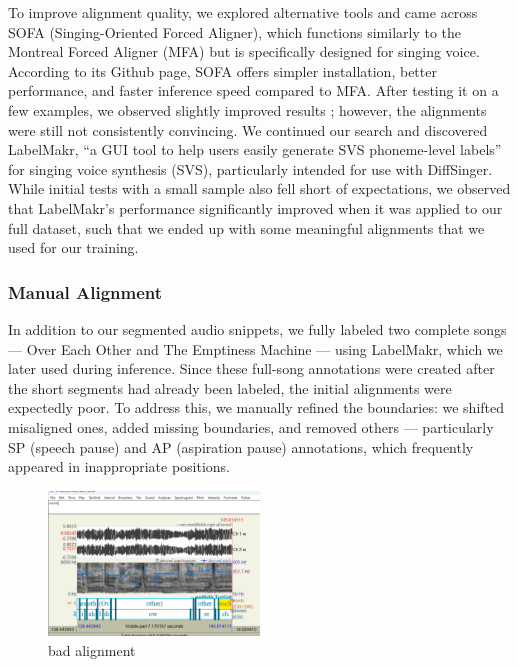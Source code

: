 \documentclass[a4paper]{article}
\begin{document}
To improve alignment quality, we explored alternative tools and came across SOFA (Singing-Oriented Forced Aligner), which functions similarly to the Montreal Forced Aligner (MFA) but is specifically designed for singing voice. According to its Github page, SOFA offers simpler installation, better performance, and faster inference speed compared to MFA. After testing it on a few examples, we observed slightly improved results \cite{Greenleaf2001}; however, the alignments were still not consistently convincing. We continued our search and discovered LabelMakr, “a GUI tool to help users easily generate SVS phoneme-level labels” \cite{spicytigermeat} for singing voice synthesis (SVS), particularly intended for use with DiffSinger. While initial tests with a small sample also fell short of expectations, we observed that LabelMakr's performance significantly improved when it was applied to our full dataset, such that we ended up with some meaningful alignments that we used for our training.

\subsubsection{Manual Alignment}
In addition to our segmented audio snippets, we fully labeled two complete songs — Over Each Other and The Emptiness Machine — using LabelMakr, which we later used during inference. Since these full-song annotations were created after the short segments had already been labeled, the initial alignments were expectedly poor. To address this, we manually refined the boundaries: we shifted misaligned ones, added missing boundaries, and removed others — particularly SP (speech pause) and AP (aspiration pause) annotations, which frequently appeared in inappropriate positions.

\begin{figure}[htbp]
    \centering
    \includegraphics[width=0.5\textwidth]{graphics/bad_alignment.png}
    \caption{bad alignment}
    \label{fig:bild2}
\end{figure}
\end{document}

